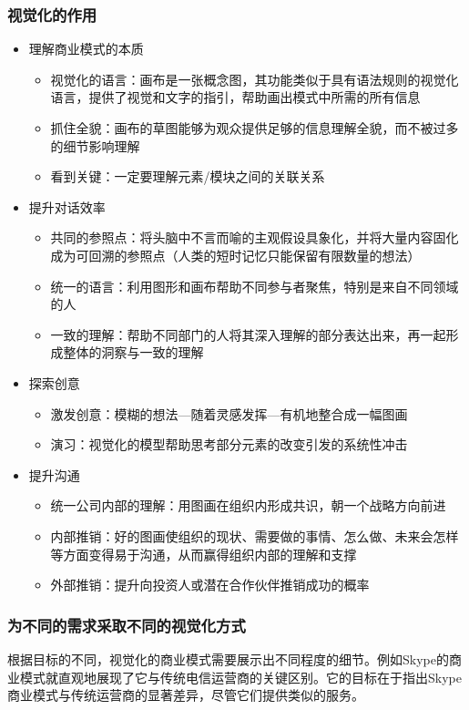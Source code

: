 \subsubsection{视觉化的作用}
\begin{itemize}
    \item 理解商业模式的本质
    \begin{itemize}
        \item 视觉化的语言：画布是一张概念图，其功能类似于具有语法规则的视觉化语言，提供了视觉和文字的指引，帮助画出模式中所需的所有信息
        \item 抓住全貌：画布的草图能够为观众提供足够的信息理解全貌，而不被过多的细节影响理解
        \item 看到关键：一定要理解元素/模块之间的关联关系
    \end{itemize}
    \item 提升对话效率
    \begin{itemize}
        \item 共同的参照点：将头脑中不言而喻的主观假设具象化，并将大量内容固化成为可回溯的参照点（人类的短时记忆只能保留有限数量的想法）
        \item 统一的语言：利用图形和画布帮助不同参与者聚焦，特别是来自不同领域的人
        \item 一致的理解：帮助不同部门的人将其深入理解的部分表达出来，再一起形成整体的洞察与一致的理解
    \end{itemize}
    \item 探索创意
    \begin{itemize}
        \item 激发创意：模糊的想法—随着灵感发挥—有机地整合成一幅图画
        \item 演习：视觉化的模型帮助思考部分元素的改变引发的系统性冲击
    \end{itemize}
    \item 提升沟通
    \begin{itemize}
        \item 统一公司内部的理解：用图画在组织内形成共识，朝一个战略方向前进
        \item 内部推销：好的图画使组织的现状、需要做的事情、怎么做、未来会怎样等方面变得易于沟通，从而赢得组织内部的理解和支撑
        \item 外部推销：提升向投资人或潜在合作伙伴推销成功的概率 
    \end{itemize}
\end{itemize}

\subsubsection{为不同的需求采取不同的视觉化方式}
根据目标的不同，视觉化的商业模式需要展示出不同程度的细节。例如Skype的商业模式就直观地展现了它与传统电信运营商的关键区别。它的目标在于指出Skype商业模式与传统运营商的显著差异，尽管它们提供类似的服务。

